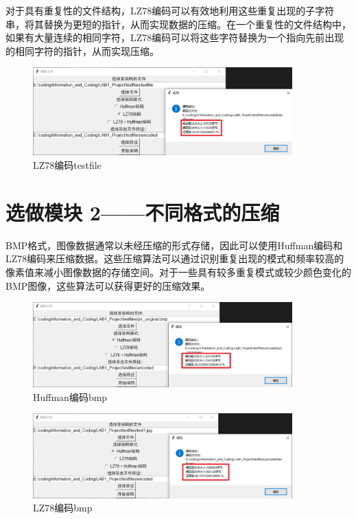 \documentclass[12pt, a4paper]{ctexart}
\begin{document}
    对于具有重复性的文件结构，LZ78编码可以有效地利用这些重复出现的子字符串，将其替换为更短的指针，从而实现数据的压缩。在一个重复性的文件结构中，如果有大量连续的相同字符，LZ78编码可以将这些字符替换为一个指向先前出现的相同字符的指针，从而实现压缩。
    
    \begin{figure}[H]
    \centering
    \includegraphics[width=10cm]{./pic/9-2.png}		
    \caption{LZ78编码testfile}
    \end{figure}

\section{选做模块 2——不同格式的压缩}


    BMP格式，图像数据通常以未经压缩的形式存储，因此可以使用Huffman编码和LZ78编码来压缩数据。这些压缩算法可以通过识别重复出现的模式和频率较高的像素值来减小图像数据的存储空间。对于一些具有较多重复模式或较少颜色变化的BMP图像，这些算法可以获得更好的压缩效果。
    \begin{figure}[H]
    \centering
    \includegraphics[width=10cm]{./pic/10-1.png}		
    \caption{Huffman编码bmp}
    \end{figure}
    \begin{figure}[H]
    \centering
    \includegraphics[width=10cm]{./pic/10-3.png}		
    \caption{LZ78编码bmp}
    \end{figure}
\end{document}

